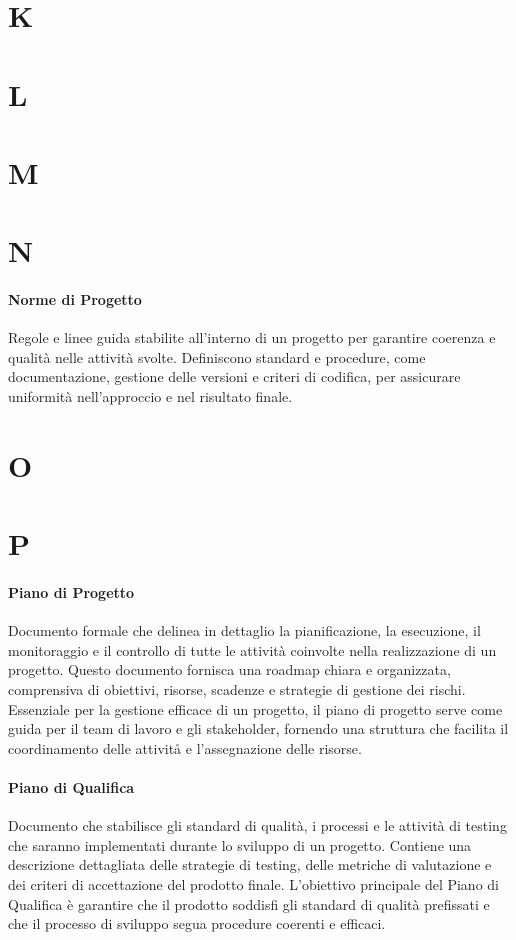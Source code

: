 \documentclass[italian,12pt]{article} %
\newcommand{\glossdef}[2]{\paragraph{#1}#2}
\begin{document}
\newpage

\section{K}



\newpage

\section{L}



\newpage

\section{M}



\newpage

\section{N}
\glossdef{Norme di Progetto}{
	Regole e linee guida stabilite all'interno di un progetto per garantire coerenza e qualità nelle attività svolte. Definiscono standard e procedure, come documentazione, gestione delle versioni e criteri di codifica, per assicurare uniformità nell'approccio e nel risultato finale.
}


\newpage

\section{O}



\newpage

\section{P}
\glossdef{Piano di Progetto}{
	Documento formale che delinea in dettaglio la pianificazione, la esecuzione, il monitoraggio e il controllo di tutte le attività coinvolte nella realizzazione di un progetto. Questo documento fornisca una roadmap chiara e organizzata, comprensiva di obiettivi, risorse, scadenze e strategie di gestione dei rischi. Essenziale per la gestione efficace di un progetto, il piano di progetto serve come guida per il team di lavoro e gli stakeholder, fornendo una struttura che facilita il coordinamento delle attivitå e l'assegnazione delle risorse.
}
\glossdef{Piano di Qualifica}{
	Documento che stabilisce gli standard di qualità, i processi e le attività di testing che saranno implementati durante lo sviluppo di un progetto. Contiene una descrizione dettagliata delle strategie di testing, delle metriche di valutazione e dei criteri di accettazione del prodotto finale. L'obiettivo principale del Piano di Qualifica è garantire che il prodotto soddisfi gli standard di qualità prefissati e che il processo di sviluppo segua procedure coerenti e efficaci.
}
\end{document}
